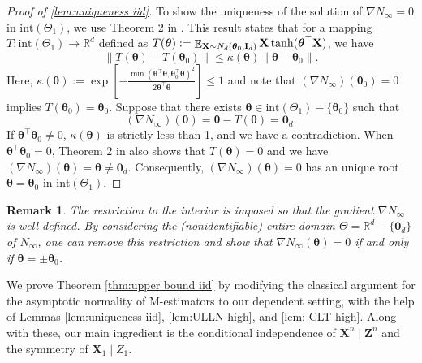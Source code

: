 \documentclass[preprint,reqno]{imsart}
\newtheorem{remark}{Remark}[section]
\newcommand{\ttheta}{\boldsymbol{\theta}}
\newcommand{\I}{\mathbf{I}_{\mathnormal{d}}}
\DeclareMathOperator{\EE}{\mathbb{E}}
\newcommand{\Z}{\mathbf{Z}}
\newcommand{\X}{\mathbf{X}}
\begin{document}
\begin{proof}[Proof of \cref{lem:uniqueness iid}]
    To show the uniqueness of the solution of $\nabla N_{\infty} = 0$ in $\text{int}(\Theta_1)$, we use Theorem 2 in \cite{daskalakis2017ten}. This result states that for a mapping $T: \text{int}(\Theta_1) \to \mathbb{R}^d$ defined as $T(\ttheta) := \EE_{\X \sim N_d(\ttheta_0, \I)} \X \tanh(\ttheta^\top \X)$, we have
    $$\|T(\ttheta) - T(\ttheta_0)\| \le \kappa(\ttheta) \|\ttheta- \ttheta_0\|.$$
    Here, $\kappa(\ttheta) := \exp\left[ - \frac{\min(\ttheta^\top \ttheta, \ttheta_0^\top \ttheta)^2}{2 \ttheta^\top \ttheta} \right] \le 1$ and note that $(\nabla N_{\infty})(\ttheta_0) = 0$ implies $T(\ttheta_0) = \ttheta_0$.
    Suppose that there exists $\ttheta\in \text{int}(\Theta_1) - \{\ttheta_0\}$ such that $$(\nabla N_\infty)(\ttheta) = \ttheta- T(\ttheta) =\mathbf{0}_d.$$ If $\ttheta^\top \ttheta_0 \neq 0$, $\kappa(\ttheta)$ is strictly less than 1, and we have a contradiction. When $\ttheta^\top \ttheta_0 = 0$, Theorem 2 in \cite{daskalakis2017ten} also shows that $T(\ttheta) = 0$ and we have $(\nabla N_\infty)(\ttheta) = \ttheta \neq \mathbf{0}_d$. Consequently, $(\nabla N_{\infty})(\ttheta) = 0$ has an unique root $\ttheta= \ttheta_0$ in $\text{int}(\Theta_1)$. 
\end{proof}
\begin{remark}
    The restriction to the interior is imposed so that the gradient $\nabla N_{\infty}$ is well-defined. By considering the (nonidentifiable) entire domain $\Theta = \mathbb{R}^d-\{\mathbf{0}_d\}$ of $N_{\infty}$, one can remove this restriction and show that $\nabla N_{\infty}(\ttheta) = 0$ if and only if $\ttheta = \pm \ttheta_0$.
\end{remark}

We prove Theorem \ref{thm:upper bound iid} by modifying the classical argument for the asymptotic normality of M-estimators to our dependent setting, with the help of Lemmas \ref{lem:uniqueness iid}, \ref{lem:ULLN high}, and \ref{lem: CLT high}. Along with these, our main ingredient is the conditional independence of $\X^n \mid \Z^n$ and the symmetry of $\X_1 \mid Z_1$.
\end{document}
